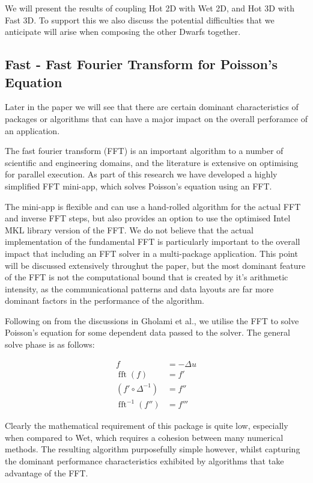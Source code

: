 \documentclass[runningheads,a4paper]{llncs}
\DeclareMathOperator{\fft}{fft}
\begin{document}
We will present the results of coupling Hot 2D with Wet 2D, and Hot 3D with Fast 3D. To support this we also discuss the potential difficulties that we anticipate will arise when composing the other Dwarfs together.

\subsection{Fast - Fast Fourier Transform for Poisson's Equation}

\label{sec:fast}

Later in the paper we will see that there are certain dominant characteristics of packages or algorithms that can have a major impact on the overall perforamce of an application. 

The fast fourier transform (FFT) is an important algorithm to a number of scientific and engineering domains, and the literature is extensive on optimising for parallel execution. As part of this research we have developed a highly simplified FFT mini-app, which solves Poisson's equation using an FFT.

The mini-app is flexible and can use a hand-rolled algorithm for the actual FFT and inverse FFT steps, but also provides an option to use the optimised Intel MKL library version of the FFT. We do not believe that the actual implementation of the fundamental FFT is particularly important to the overall impact that including an FFT solver in a multi-package application. This point will be discussed extensively throughut the paper, but the most dominant feature of the FFT is not the computational bound that is created by it's arithmetic intensity, as the communicational patterns and data layouts are far more dominant factors in the performance of the algorithm.

Following on from the discussions in Gholami et al., we utilise the FFT to solve Poisson's equation for some dependent data passed to the solver. The general solve phase is as follows:

\begin{align}
  f &= -\Delta u \\
  \fft(f) &= f' \\
  (f' \circ \Delta^{-1}) &= f'' \\
  \fft^{-1}(f'') &= f'''
\end{align}

Clearly the mathematical requirement of this package is quite low, especially when compared to Wet, which requires a cohesion between many numerical methods. The resulting algorithm purposefully simple however, whilst capturing the dominant performance characteristics exhibited by algorithms that take advantage of the FFT.
\end{document}
